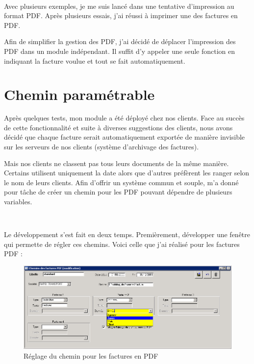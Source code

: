 ~

Avec plusieurs exemples, je me suis lancé dans une tentative d'impression au format PDF. Après plusieurs essais, j'ai réussi à imprimer une des factures en PDF.

Afin de simplifier la gestion des PDF, j'ai décidé de déplacer l'impression des PDF dans un module indépendant. Il suffit d'y appeler une seule fonction en indiquant la facture voulue et tout se fait automatiquement.

\section{Chemin paramétrable}
\label{pdf_param}
Après quelques tests, mon module a été déployé chez nos clients. Face au succès de cette fonctionnalité et suite à diverses suggestions des clients, nous avons décidé que chaque facture serait automatiquement exportée de manière invisible sur les serveurs de nos clients (système d'archivage des factures).

Mais nos clients ne classent pas tous leurs documents de la même manière. Certains utilisent uniquement la date alors que d'autres préfèrent les ranger selon le nom de leurs clients. Afin d'offrir un système commun et souple, \solulog{} m'a donné pour tâche de créer un chemin pour les PDF pouvant dépendre de plusieurs variables.

~

Le développement s'est fait en deux temps. Premièrement, développer une fenêtre qui permette de régler ces chemins. Voici celle que j'ai réalisé pour les factures PDF :
\begin{figure}[h!]
	\begin{center}
		\includegraphics[scale=.78]{Contenu/Synthese_SeptembreAvril/Images/Chemin_PDF.png}
	\end{center}

	\caption{Réglage du chemin pour les factures en PDF}
	\label{segment_NAD_CA}
\end{figure}

